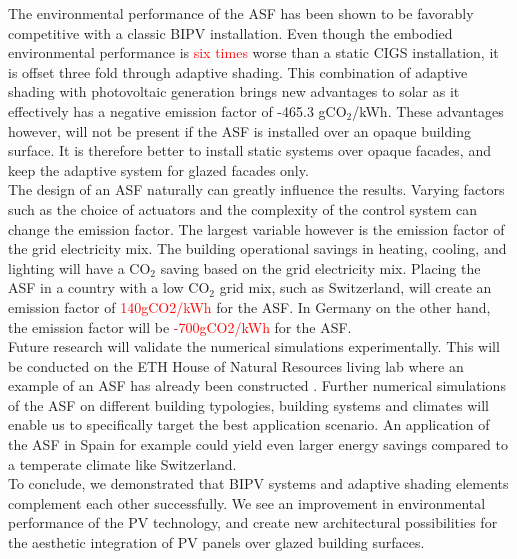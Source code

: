 
The environmental performance of the ASF has been shown to be favorably competitive with a classic BIPV installation. Even though the embodied environmental performance is \textcolor{red}{six times} worse than a static CIGS installation, it is offset three fold through adaptive shading. This combination of adaptive shading with photovoltaic generation brings new advantages to solar as it effectively has a negative emission factor of -465.3 gCO${_2}$/kWh. These advantages however, will not be present if the ASF is installed over an opaque building surface. It is therefore better to install static systems over opaque facades, and keep the adaptive system for glazed facades only. \\

The design of an ASF naturally can greatly influence the results. Varying factors such as the choice of actuators and the complexity of the control system can change the emission factor. The largest variable however is the emission factor of the grid electricity mix. The building operational savings in heating, cooling, and lighting will have a CO${_2}$ saving based on the grid electricity mix. Placing the ASF in a country with a low CO${_2}$ grid mix, such as Switzerland, will create an emission factor of \textcolor{red}{140gCO2/kWh} for the ASF. In Germany on the other hand, the emission factor will be \textcolor{red}{-700gCO2/kWh} for the ASF.\\

Future research will validate the numerical simulations experimentally. This will be conducted on the ETH House of Natural Resources living lab where an example of an ASF has already been constructed \cite{nagy2015frontiers}. Further numerical simulations of the ASF on different building typologies, building systems and climates will enable us to specifically target the best application scenario. An application of the ASF in Spain for example could yield even larger energy savings compared to a temperate climate like Switzerland.\\

To conclude, we demonstrated that BIPV systems and adaptive shading elements complement each other successfully. We see an improvement in environmental performance of the PV technology, and create new architectural possibilities for the aesthetic integration of PV panels over glazed building surfaces. 


